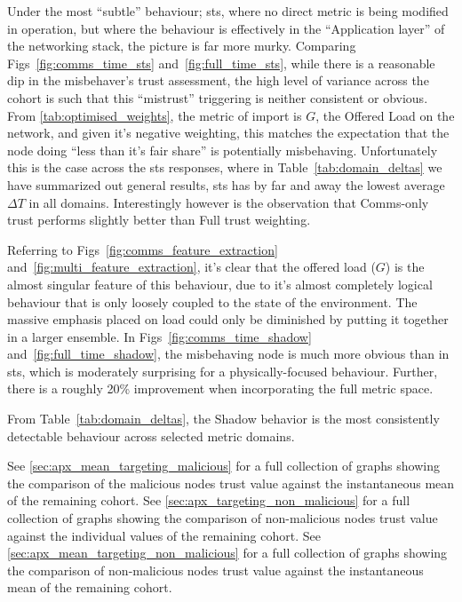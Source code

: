 Under the most ``subtle'' behaviour; \gls{sts}, where no direct metric is being modified in operation, but where the behaviour is effectively in the ``Application layer'' of the networking stack, the picture is far more murky. 
Comparing Figs~\ref{fig:comms_time_sts} and~\ref{fig:full_time_sts}, while there is a reasonable dip in the misbehaver’s trust assessment, the high level of variance across the cohort is such that this ``mistrust'' triggering is neither consistent or obvious. 
From \autoref{tab:optimised_weights}, the metric of import is $G$, the Offered Load on the network, and given it's negative weighting, this matches the expectation that the node doing ``less than it's fair share'' is potentially misbehaving. 
Unfortunately this is the case across the \gls{sts} responses, where in Table~\ref{tab:domain_deltas} we have summarized out general results, \gls{sts} has by far and away the lowest average $\Delta T$ in all domains. 
Interestingly however is the observation that Comms-only trust performs slightly better than Full trust weighting.

Referring to Figs~\ref{fig:comms_feature_extraction} and~\autoref{fig:multi_feature_extraction}, it's clear that the offered load ($G$) is the almost singular feature of this behaviour, due to it's almost completely logical behaviour that is only loosely coupled to the state of the environment. 
The massive emphasis placed on load could only be diminished by putting it together in a larger ensemble.
In Figs~\ref{fig:comms_time_shadow} and~\ref{fig:full_time_shadow}, the misbehaving node is much more obvious than in \gls{sts}, which is moderately surprising for a physically-focused behaviour. Further, there is a roughly 20\% improvement when incorporating the full metric space.

From Table~\ref{tab:domain_deltas}, the Shadow behavior is the most consistently detectable behaviour across selected metric domains. 


See \autoref{sec:apx_mean_targeting_malicious} for a full collection of graphs showing the comparison of the malicious nodes trust value against the instantaneous mean of the remaining cohort.
See \autoref{sec:apx_targeting_non_malicious} for a full collection of graphs showing the comparison of non-malicious nodes trust value against the individual values of the remaining cohort.
See \autoref{sec:apx_mean_targeting_non_malicious} for a full collection of graphs showing the comparison of non-malicious nodes trust value against the instantaneous mean of the remaining cohort.


